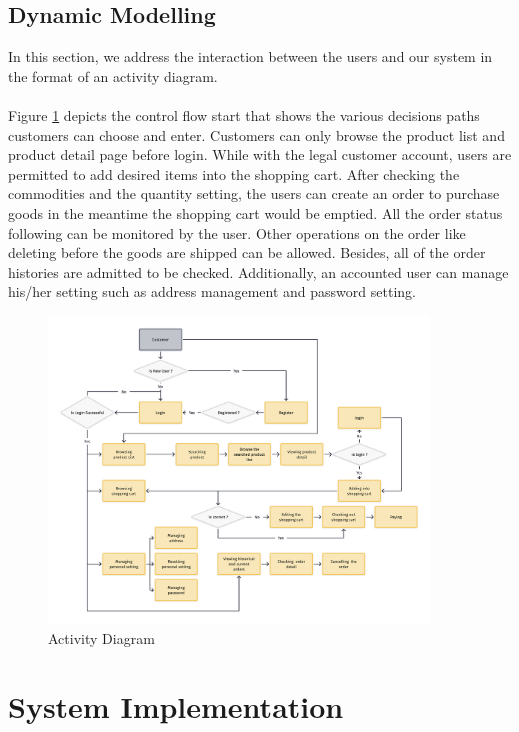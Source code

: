 \documentclass{article}
\begin{document}
\subsection{Dynamic Modelling}
In this section, we address the interaction between the users and our system in the format of an activity diagram.
\\\\
Figure \ref{fig:Activity Diagram} depicts the control flow start that shows the various decisions paths customers can choose and enter. Customers can only browse the product list and product detail page before login. While with the legal customer account, users are permitted to add desired items into the shopping cart. After checking the commodities and the quantity setting, the users can create an order to purchase goods in the meantime the shopping cart would be emptied. All the order status following can be monitored by the user. Other operations on the order like deleting before the goods are shipped can be allowed.  Besides, all of the order histories are admitted to be checked. Additionally, an accounted user can manage his/her setting such as address management and password setting. 
\begin{figure}[!htp]
    \centering
    \includegraphics[width=0.9\textwidth]{Activity Diagram.png}
    \caption{\label{fig:Activity Diagram}Activity Diagram}
\end{figure}

\section{System Implementation}
\end{document}

